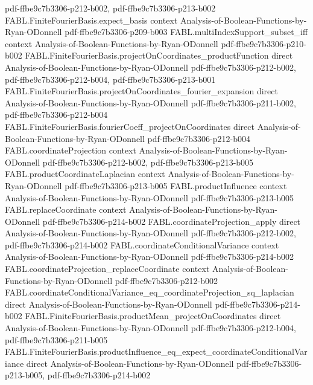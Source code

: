 \begin{theorem}
  {pdf-ffbe9c7b3306-p212-b002,
    pdf-ffbe9c7b3306-p213-b002}
\proofstep
  {FABL.FiniteFourierBasis.expect_basis}
  {context}
  {Analysis-of-Boolean-Functions-by-Ryan-ODonnell}
  {pdf-ffbe9c7b3306-p209-b003}
\proofstep
  {FABL.multiIndexSupport_subset_iff}
  {context}
  {Analysis-of-Boolean-Functions-by-Ryan-ODonnell}
  {pdf-ffbe9c7b3306-p210-b002}
\proofstep
  {FABL.FiniteFourierBasis.projectOnCoordinates_productFunction}
  {direct}
  {Analysis-of-Boolean-Functions-by-Ryan-ODonnell}
  {pdf-ffbe9c7b3306-p212-b002,
    pdf-ffbe9c7b3306-p212-b004,
    pdf-ffbe9c7b3306-p213-b001}
\proofstep
  {FABL.FiniteFourierBasis.projectOnCoordinates_fourier_expansion}
  {direct}
  {Analysis-of-Boolean-Functions-by-Ryan-ODonnell}
  {pdf-ffbe9c7b3306-p211-b002,
    pdf-ffbe9c7b3306-p212-b004}
\proofstep
  {FABL.FiniteFourierBasis.fourierCoeff_projectOnCoordinates}
  {direct}
  {Analysis-of-Boolean-Functions-by-Ryan-ODonnell}
  {pdf-ffbe9c7b3306-p212-b004}
\proofstep
  {FABL.coordinateProjection}
  {context}
  {Analysis-of-Boolean-Functions-by-Ryan-ODonnell}
  {pdf-ffbe9c7b3306-p212-b002,
    pdf-ffbe9c7b3306-p213-b005}
\proofstep
  {FABL.productCoordinateLaplacian}
  {context}
  {Analysis-of-Boolean-Functions-by-Ryan-ODonnell}
  {pdf-ffbe9c7b3306-p213-b005}
\proofstep
  {FABL.productInfluence}
  {context}
  {Analysis-of-Boolean-Functions-by-Ryan-ODonnell}
  {pdf-ffbe9c7b3306-p213-b005}
\proofstep
  {FABL.replaceCoordinate}
  {context}
  {Analysis-of-Boolean-Functions-by-Ryan-ODonnell}
  {pdf-ffbe9c7b3306-p214-b002}
\proofstep
  {FABL.coordinateProjection_apply}
  {direct}
  {Analysis-of-Boolean-Functions-by-Ryan-ODonnell}
  {pdf-ffbe9c7b3306-p212-b002,
    pdf-ffbe9c7b3306-p214-b002}
\proofstep
  {FABL.coordinateConditionalVariance}
  {context}
  {Analysis-of-Boolean-Functions-by-Ryan-ODonnell}
  {pdf-ffbe9c7b3306-p214-b002}
\proofstep
  {FABL.coordinateProjection_replaceCoordinate}
  {context}
  {Analysis-of-Boolean-Functions-by-Ryan-ODonnell}
  {pdf-ffbe9c7b3306-p212-b002}
\proofstep
  {FABL.coordinateConditionalVariance_eq_coordinateProjection_sq_laplacian}
  {direct}
  {Analysis-of-Boolean-Functions-by-Ryan-ODonnell}
  {pdf-ffbe9c7b3306-p214-b002}
\proofstep
  {FABL.FiniteFourierBasis.productMean_projectOnCoordinates}
  {direct}
  {Analysis-of-Boolean-Functions-by-Ryan-ODonnell}
  {pdf-ffbe9c7b3306-p212-b004,
    pdf-ffbe9c7b3306-p211-b005}
\proofstep
  {FABL.FiniteFourierBasis.productInfluence_eq_expect_coordinateConditionalVariance}
  {direct}
  {Analysis-of-Boolean-Functions-by-Ryan-ODonnell}
  {pdf-ffbe9c7b3306-p213-b005,
    pdf-ffbe9c7b3306-p214-b002}
\proofstep

\end{theorem}
